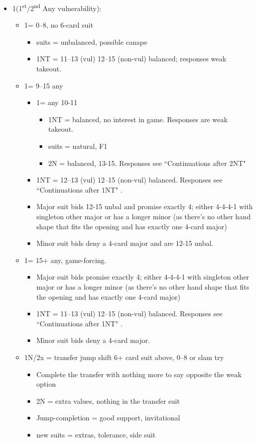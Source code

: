 \documentclass[a4paper,14pt]{extarticle}
\begin{document}
\begin{itemize}
\item 1\clubs (1\textsuperscript{st}/2\textsuperscript{nd} Any vulnerability):
	\begin{itemize}
   \item 1\diamonds = 0--8, no 6-card suit
		\begin{itemize}
      \item suits = unbalanced, possible canape
      \item 1NT = 11--13 (vul) 12--15 (non-vul) balanced; responses weak takeout.
		\end{itemize}
   \item 1\hearts = 9--15 any
		\begin{itemize}
      \item 1\spades = any 10-11
			\begin{itemize}
			\item 1NT = balanced, no interest in game. Responses are weak takeout.
			\item suits = natural, F1
			\item 2N = balanced, 13-15. Responses see ``Continuations after 2NT" 
			\end{itemize}
      \item 1NT = 12--13 (vul) 12--15 (non-vul) balanced. Responses see ``Continuations after 1NT" .
      \item Major suit bids 12-15 unbal and promise exactly 4; either 4-4-4-1
            with singleton other major or has a longer minor (as there's no other
            hand shape that fits the opening and has exactly one 4-card major)
      \item Minor suit bids deny a 4-card major and are 12-15 unbal.
		\end{itemize}
   \item 1\spades = 15+ any, game-forcing.
		\begin{itemize}
      \item Major suit bids promise exactly 4; either 4-4-4-1 with singleton other
         major or has a longer minor (as there's no other hand shape that fits the
         opening and has exactly one 4-card major)
      \item 1NT = 11--13 (vul) 12--15 (non-vul) balanced. Responses see ``Continuations after 1NT" .
      \item Minor suit bids deny a 4-card major.
		\end{itemize}
   \item 1N/2x = transfer jump shift 6+ card suit above, 0--8 or slam try
		\begin{itemize}
		\item Complete the transfer with nothing more to say opposite the weak option
		\item 2N = extra values, nothing in the transfer suit
		\item Jump-completion = good support, invitational
		\item new suits = extras, tolerance, side suit
		\end{itemize}
	\end{itemize}


\end{itemize}
\end{document}
